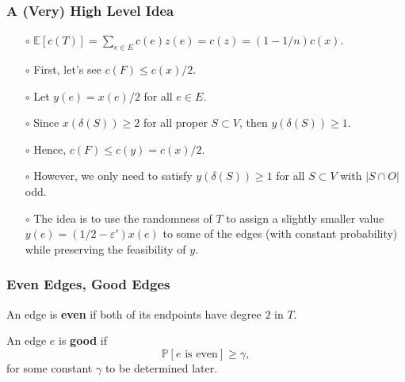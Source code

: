 \documentclass{beamer}
\newcommand{\EE}{\mathbb{E}}
\newcommand{\PP}{\mathbb{P}}
\begin{document}
  \begin{frame}
    \frametitle{A (Very) High Level Idea}

    \pause
  
    \begin{enumerate}
      \item[$\circ$] $\EE[c(T)] = \sum_{e \in E} c(e) z(e) = c(z) = (1 - 1/n) c(x)$. \pause
      \item[$\circ$] First, let's see $c(F) \leq c(x)/2$. \pause
      \item[$\circ$] Let $y(e) = x(e)/2$ for all $e \in E$. \pause
      \item[$\circ$] Since $x(\delta(S)) \geq 2$ for all proper $S \subset V$, then $y(\delta(S)) \geq 1$. \pause
      \item[$\circ$] Hence, $c(F) \leq c(y) = c(x)/2$. \pause
      \item[$\circ$] However, we only need to satisfy $y(\delta(S)) \geq 1$ for all $S \subset V$ with $|S \cap O|$ odd. \pause
      \item[$\circ$] The idea is to use the randomness of $T$ to assign a slightly smaller value $y(e) = (1/2 - \varepsilon') x(e)$ to some of the edges (with constant probability) while preserving the feasibility of $y$.
    \end{enumerate}
  
  \end{frame}

  \begin{frame}
    \frametitle{Even Edges, Good Edges}
  
    \begin{definition}
      An edge is {\bf even} if both of its endpoints have degree $2$ in $T$.
    \end{definition}

    \pause

    \begin{definition}
      An edge $e$ is {\bf good} if
      $$ \PP[\text{$e$ is even}] \geq \gamma, $$
      for some constant $\gamma$ to be determined later.
    \end{definition}
  
  \end{frame}
\end{document}
